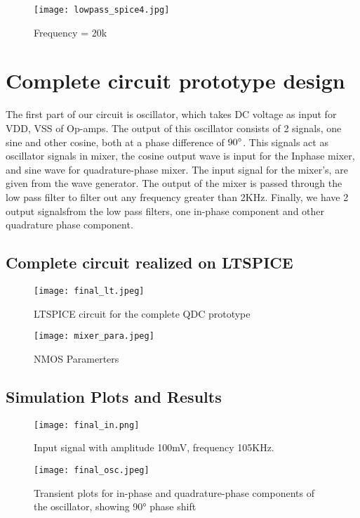 \documentclass[conference]{IEEEtran}
\begin{document}
\begin{figure}[H]
\centering
\texttt{[image: lowpass\_spice4.jpg]}
\caption{Frequency = 20k}
\end{figure}

\section{Complete circuit prototype design}
The first part of our circuit is oscillator, which takes DC
voltage as input for VDD, VSS of Op-amps. The output of this
oscillator consists of 2 signals, one sine and other cosine, both
at a phase difference of $90\degree$. This signals act as oscillator
signals in mixer, the cosine output wave is input for the Inphase mixer, and sine wave for quadrature-phase mixer. The
input signal for the mixer’s, are given from the wave
generator. The output of the mixer is passed through the low
pass filter to filter out any frequency greater than 2KHz.
Finally, we have 2 output signalsfrom the low pass filters, one
in-phase component and other quadrature phase component.

\subsection{Complete circuit realized on LTSPICE}
\begin{figure*}[!t]
\centering
\texttt{[image: final\_lt.jpeg]}
\caption{LTSPICE circuit for the complete QDC prototype}
\end{figure*}

\begin{figure}[H]
\centering
\texttt{[image: mixer\_para.jpeg]}
\caption{NMOS Paramerters}
\end{figure}

\subsection{Simulation Plots and Results}

\begin{figure}[H]
\centering
\texttt{[image: final\_in.png]}
\caption{Input signal with amplitude 100mV, frequency 105KHz.}
\end{figure}

\begin{figure}[H]
\centering
\texttt{[image: final\_osc.jpeg]}
\caption{ Transient plots for in-phase and quadrature-phase
components of the oscillator, showing 90° phase shift}
\end{figure}
\end{document}
